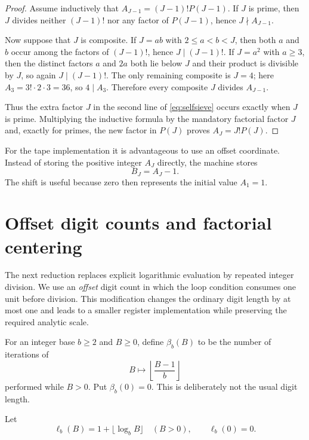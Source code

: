 \documentclass[10pt]{article}
\theoremstyle{definition}
\begin{document}
\begin{proof}
Assume inductively that $A_{J-1}=(J-1)!P(J-1)$. If $J$ is prime, then $J$
divides neither $(J-1)!$ nor any factor of $P(J-1)$, hence $J\nmid A_{J-1}$.

Now suppose that $J$ is composite. If $J=ab$ with $2\le a<b<J$, then both $a$
and $b$ occur among the factors of $(J-1)!$, hence $J\mid(J-1)!$. If $J=a^2$
with $a\ge3$, then the distinct factors $a$ and $2a$ both lie below $J$ and
their product is divisible by $J$, so again $J\mid(J-1)!$. The only remaining
composite is $J=4$; here $A_3=3!\cdot2\cdot3=36$, so $4\mid A_3$. Therefore
every composite $J$ divides $A_{J-1}$.

Thus the extra factor $J$ in the second line of \eqref{eq:selfsieve} occurs
exactly when $J$ is prime. Multiplying the inductive formula by the mandatory
factorial factor $J$ and, exactly for primes, the new factor in $P(J)$ proves
$A_J=J!P(J)$.
\end{proof}

For the tape implementation it is advantageous to use an offset coordinate.
Instead of storing the positive integer $A_J$ directly, the machine stores
\begin{equation}
\label{eq:Bdef}
B_J=A_J-1.
\end{equation}
The shift is useful because zero then represents the initial value $A_1=1$.

\section{Offset digit counts and factorial centering}

The next reduction replaces explicit logarithmic evaluation by repeated
integer division. We use an \emph{offset} digit count in which the loop
condition consumes one unit before division. This modification changes the
ordinary digit length by at most one and leads to a smaller register
implementation while preserving the required analytic scale.

For an integer base $b\ge2$ and $B\ge0$, define $\beta_b(B)$ to be the number
of iterations of
\begin{equation}
\label{eq:beta_iter}
B\longmapsto \left\lfloor\frac{B-1}{b}\right\rfloor
\end{equation}
performed while $B>0$. Put $\beta_b(0)=0$. This is deliberately not the usual
digit length.

Let
\[
\ell_b(B)=1+\lfloor\log_b B\rfloor\quad(B>0),
\qquad \ell_b(0)=0.
\]
\end{document}
